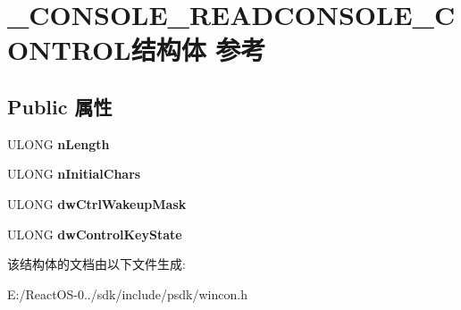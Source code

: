 \hypertarget{struct___c_o_n_s_o_l_e___r_e_a_d_c_o_n_s_o_l_e___c_o_n_t_r_o_l}{}\section{\+\_\+\+C\+O\+N\+S\+O\+L\+E\+\_\+\+R\+E\+A\+D\+C\+O\+N\+S\+O\+L\+E\+\_\+\+C\+O\+N\+T\+R\+O\+L结构体 参考}
\label{struct___c_o_n_s_o_l_e___r_e_a_d_c_o_n_s_o_l_e___c_o_n_t_r_o_l}
\subsection*{Public 属性}
\begin{DoxyCompactItemize}
\item 
\mbox{\label{struct___c_o_n_s_o_l_e___r_e_a_d_c_o_n_s_o_l_e___c_o_n_t_r_o_l_aae1c56c737a158776ed46553afd6e1ed}} 
U\+L\+O\+NG {\bfseries n\+Length}
\item 
\mbox{\label{struct___c_o_n_s_o_l_e___r_e_a_d_c_o_n_s_o_l_e___c_o_n_t_r_o_l_a11e8c80810763be0188e3b221583c016}} 
U\+L\+O\+NG {\bfseries n\+Initial\+Chars}
\item 
\mbox{\label{struct___c_o_n_s_o_l_e___r_e_a_d_c_o_n_s_o_l_e___c_o_n_t_r_o_l_a89efb45aed1be397dcfe23f62dd73ac0}} 
U\+L\+O\+NG {\bfseries dw\+Ctrl\+Wakeup\+Mask}
\item 
\mbox{\label{struct___c_o_n_s_o_l_e___r_e_a_d_c_o_n_s_o_l_e___c_o_n_t_r_o_l_a536219e791c4469ca87e14b9620bf1c8}} 
U\+L\+O\+NG {\bfseries dw\+Control\+Key\+State}
\end{DoxyCompactItemize}


该结构体的文档由以下文件生成\+:\begin{DoxyCompactItemize}
\item 
E\+:/\+React\+O\+S-\/0../sdk/include/psdk/wincon.\+h\end{DoxyCompactItemize}
